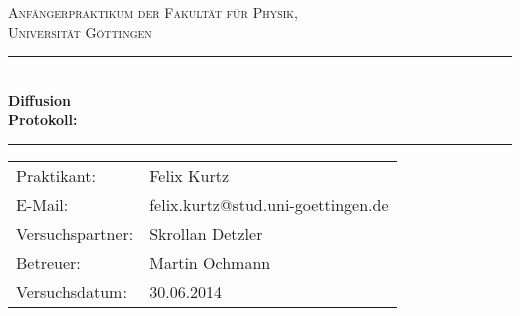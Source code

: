 \documentclass[12pt,a4paper,titlepage,headinclude,bibtotoc]{scrartcl}
\begin{document}
\begin{titlepage}
\centering
\textsc{\Large Anfängerpraktikum der Fakultät für
  Physik,\\[1.5ex] Universität Göttingen}

\vspace*{4.2cm}

\rule{\textwidth}{1pt}\\[0.5cm]
{\huge \bfseries
  Diffusion\\[1.5ex]
  Protokoll:}\\[0.5cm]
\rule{\textwidth}{1pt}

\vspace*{3.0cm}

\begin{Large}
\begin{tabular}{ll}
Praktikant:
 	&  Felix Kurtz\\

  E-Mail: 
	&  felix.kurtz@stud.uni-goettingen.de\\

Versuchspartner:
	&  Skrollan Detzler\\

 Betreuer: & Martin Ochmann\\
 Versuchsdatum: & 30.06.2014\\
\end{tabular}
\end{Large}

\vspace*{0.8cm}

\begin{Large}
\end{Large}

\end{titlepage}
\end{document}

